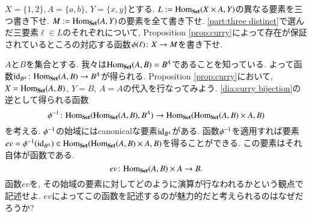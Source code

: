 \begin{exercise}
$X=\{1,2\}, A=\{a,b\}$, $Y=\{x,y\}$とする.
\sexc\label{part:three distinct} $L:=\textrm{Hom}_{\bf Set}(X\times A,Y)$の異なる要素を三つ書き下せ.
\next $M:=\textrm{Hom}_{\bf Set}(A,Y)$の要素を全て書き下せ.
\next \eqref{part:three distinct}で選んだ三要素$\ell\in L$のそれぞれについて, Proposition \ref{prop:curry}によって存在が保証されているところの対応する函数$\phi(\ell)\colon X\rightarrow M$を書き下せ.
\endsexc
\end{exercise}

\begin{exercise}\label{exc:evaluation}
%
$A$と$B$を集合とする. 我々は$\textrm{Hom}_{\bf Set}(A,B)=B^A$であることを知っている. よって函数$\textrm{id}_{B^A}\colon\textrm{Hom}_{\bf Set}(A,B)\rightarrow B^A$が得られる. Proposition \ref{prop:curry}において, $X=\textrm{Hom}_{\bf Set}(A,B)$, $Y=B$, $A=A$の代入を行なってみよう. \eqref{dia:curry bijection}の逆として得られる函数$$\phi^\m1\taking\Hom_\Set(\Hom_\Set(A,B),B^A)\to\Hom_\Set(\Hom_\Set(A,B)\times A,B)$$を考える. $\phi^\m1$の始域にはcanonicalな要素$\textrm{id}_{B^A}$がある. 函数$\phi^\m1$を適用すれば要素$ev=\phi^\m1(\id_{B^A})\in\Hom_\Set(\Hom_\Set(A,B)\times A,B)$を得ることができる. この要素はそれ自体が函数である. $$ev\colon\textrm{Hom}_{\bf Set}(A,B)\times A\rightarrow B.$$ 
\sexc 函数$ev$を, その始域の要素に対してどのように演算が行なわれるかという観点で記述せよ.
\next $ev$によってこの函数を記述するのが魅力的だと考えられるのはなぜだろうか?
\endsexc
\end{exercise}

